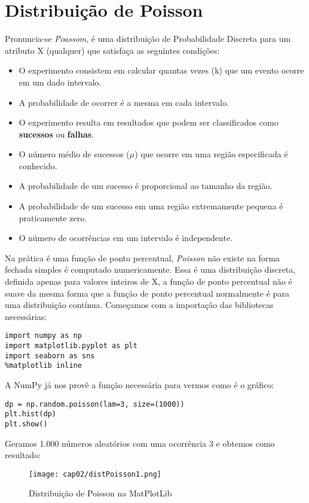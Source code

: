 \section{Distribuição de Poisson}
Pronuncia-se \textit{Poassom}, é uma distribuição de Probabilidade Discreta para um atributo X (qualquer) que satisfaça as seguintes condições:
\vspace{-1em}
\begin{itemize}[noitemsep]
	\item O experimento consistem em calcular quantas vezes (k) que um evento ocorre em um dado intervalo.
	\item A probabilidade de ocorrer é a mesma em cada intervalo.
	\item O experimento resulta em resultados que podem ser classificados como \textbf{sucessos} ou \textbf{falhas}.
	\item O número médio de sucessos ($\mu$) que ocorre em uma região especificada é conhecido.
	\item A probabilidade de um sucesso é proporcional ao tamanho da região.
	\item A probabilidade de um sucesso em uma região extremamente pequena é praticamente zero.
	\item O número de ocorrências em um intervalo é independente.
\end{itemize}

Na prática é uma função de ponto percentual, \textit{Poisson} não existe na forma fechada simples é computado numericamente. Essa é uma distribuição discreta, definida apenas para valores inteiros de X, a função de ponto percentual não é suave da mesma forma que a função de ponto percentual normalmente é para uma distribuição contínua. Começamos com a importação das bibliotecas necessárias:
\begin{lstlisting}[]
import numpy as np
import matplotlib.pyplot as plt
import seaborn as sns
%matplotlib inline
\end{lstlisting}

A NumPy já nos provê a função necessária para vermos como é o gráfico:
\begin{lstlisting}[]
dp = np.random.poisson(lam=3, size=(1000))
plt.hist(dp)
plt.show()
\end{lstlisting}

Geramos 1.000 números aleatórios com uma ocorrência 3 e obtemos como resultado:
\begin{figure}[H]
	\centering
	\texttt{[image: cap02/distPoisson1.png]}
	\caption{Distribuição de Poisson na MatPlotLib}
\end{figure}

